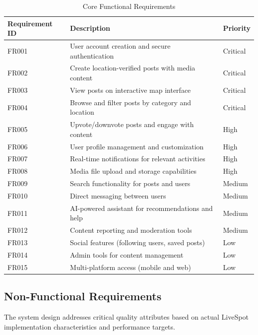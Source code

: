 \begin{table}[h!]
    \centering
    \caption{Core Functional Requirements}
    \label{tab:functional_requirements}
    \begin{tabular}{lll}     
        \toprule
        Requirement ID & Description & Priority \\
        \midrule
        FR001 & User account creation and secure authentication & Critical \\
        FR002 & Create location-verified posts with media content & Critical \\
        FR003 & View posts on interactive map interface & Critical \\
        FR004 & Browse and filter posts by category and location & Critical \\
        FR005 & Upvote/downvote posts and engage with content & High \\
        FR006 & User profile management and customization & High \\
        FR007 & Real-time notifications for relevant activities & High \\
        FR008 & Media file upload and storage capabilities & High \\
        FR009 & Search functionality for posts and users & Medium \\
        FR010 & Direct messaging between users & Medium \\
        FR011 & AI-powered assistant for recommendations and help & Medium \\
        FR012 & Content reporting and moderation tools & Medium \\
        FR013 & Social features (following users, saved posts) & Low \\
        FR014 & Admin tools for content management & Low \\
        FR015 & Multi-platform access (mobile and web) & Low \\
        \bottomrule
    \end{tabular}
\end{table}

\subsection{Non-Functional Requirements}

The system design addresses critical quality attributes based on actual LiveSpot implementation characteristics and performance targets.

